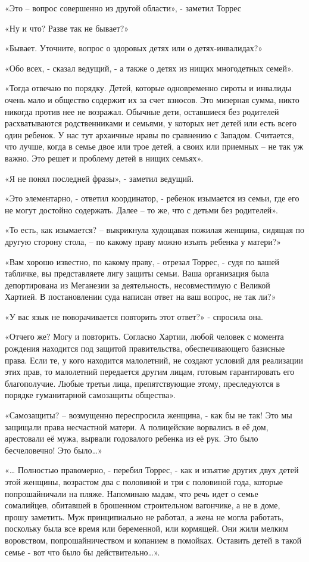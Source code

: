 \documentclass[10pt,final]{book}
\begin{document}
«Это -- вопрос совершенно из другой области», - заметил Торрес

«Ну и что? Разве так не бывает?»

«Бывает. Уточните, вопрос о здоровых детях или о детях-инвалидах?»

«Обо всех, - сказал ведущий, - а также о детях из нищих многодетных семей».

«Тогда отвечаю по порядку. Детей, которые одновременно сироты и инвалиды очень мало и общество содержит их за счет взносов. Это мизерная сумма, никто никогда против нее не возражал. Обычные дети, оставшиеся без родителей расхватываются родственниками и семьями, у которых нет детей или есть всего один ребенок. У нас тут архаичные нравы по сравнению с Западом. Считается, что лучше, когда в семье двое или трое детей, а своих или приемных -- не так уж важно. Это решет и проблему детей в нищих семьях».

«Я не понял последней фразы», - заметил ведущий.

«Это элементарно, - ответил координатор, - ребенок изымается из семьи, где его не могут достойно содержать. Далее -- то же, что с детьми без родителей».

«То есть, как изымается? -- выкрикнула худощавая пожилая женщина, сидящая по другую сторону стола, -- по какому праву можно изъять ребенка у матери?»

«Вам хорошо известно, по какому праву, - отрезал Торрес, - судя по вашей табличке, вы представляете лигу защиты семьи. Ваша организация была депортирована из Меганезии за деятельность, несовместимую с Великой Хартией. В постановлении суда написан ответ на ваш вопрос, не так ли?»

«У вас язык не поворачивается повторить этот ответ?» - спросила она.

«Отчего же? Могу и повторить. Согласно Хартии, любой человек с момента рождения находится под защитой правительства, обеспечивающего базисные права. Если те, у кого находится малолетний, не создают условий для реализации этих прав, то малолетний передается другим лицам, готовым гарантировать его благополучие. Любые третьи лица, препятствующие этому, преследуются в порядке гуманитарной самозащиты общества».

«Самозащиты? -- возмущенно переспросила женщина, - как бы не так! Это мы защищали права несчастной матери. А полицейские ворвались в её дом, арестовали её мужа, вырвали годовалого ребенка из её рук. Это было бесчеловечно! Это было\ldots{}»

«\ldots{} Полностью правомерно, - перебил Торрес, - как и изъятие других двух детей этой женщины, возрастом два с половиной и три с половиной года, которые попрошайничали на пляже. Напоминаю мадам, что речь идет о семье сомалийцев, обитавшей в брошенном строительном вагончике, а не в доме, прошу заметить. Муж принципиально не работал, а жена не могла работать, поскольку была все время или беременной, или кормящей. Они жили мелким воровством, попрошайничеством и копанием в помойках. Оставить детей в такой семье - вот что было бы действительно\ldots{}».
\end{document}
